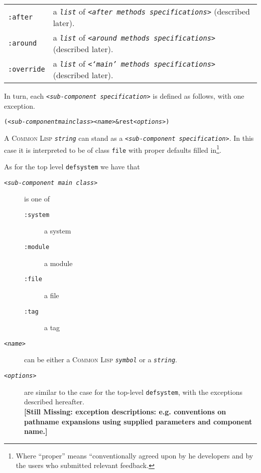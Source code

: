 \documentclass[a4paper]{article}
\newcommand{\CL}{\textsc{Common Lisp}}
\newcommand{\missingpart}[1]{{\ }\vspace{2mm}\\
{\textbf{[Still Missing: #1]}}\\
\vspace{2mm}}
\newcommand{\code}[1]{\texttt{#1}}
\newcommand{\clobject}[1]{\texttt{\textit{#1}}} %
\newcommand{\syntaxnt}[1]{\emph{<#1>}}
\begin{document}
\begin{description}
\begin{tabular}{p{}p{}}
	\code{:after}
		& a \clobject{list} of \code{\syntaxnt{after methods
		specifications}} (described later).\\[1mm]

	\code{:around}
		& a \clobject{list} of \code{\syntaxnt{around methods
		specifications}} (described later).\\[1mm]

	\code{:override}
		& a \clobject{list} of \code{\syntaxnt{`main' methods
		specifications}} (described later).\\[1mm]

	\end{tabular}
\end{description}

\noindent
In turn, each \code{\syntaxnt{sub-component specification}} is defined as
follows, with one exception.
\begin{alltt}
  (\syntaxnt{sub-component main class} \syntaxnt{name} &rest \syntaxnt{options})
\end{alltt}
A \CL{} \clobject{string} can stand as a \code{\syntaxnt{sub-component
specification}}.  In this case it is interpreted to be of class
\code{file} with proper defaults filled in\footnote{Where ``proper''
means ``conventionally agreed upon by he developers and by the users
who submitted relevant feedback.}.

\noindent
As for the top level \code{defsystem} we have that
\begin{description}
\item[{\code{\syntaxnt{sub-component main class}}}] is one of
	\begin{description}
	\item[\code{:system}] a system
	\item[\code{:module}] a module
	\item[\code{:file}] a file
	\item[\code{:tag}] a tag
	\end{description}

\item[\code{\syntaxnt{name}}] can be either a \CL{} \clobject{symbol} or
	a \clobject{string}.

\item[\code{\syntaxnt{options}}] are similar to the case for the
	top-level \code{defsystem}, with the exceptions described
	hereafter.
	\missingpart{exception descriptions: e.g. conventions on
	pathname expansions using supplied parameters and component
	name.}
\end{description}
\end{document}
